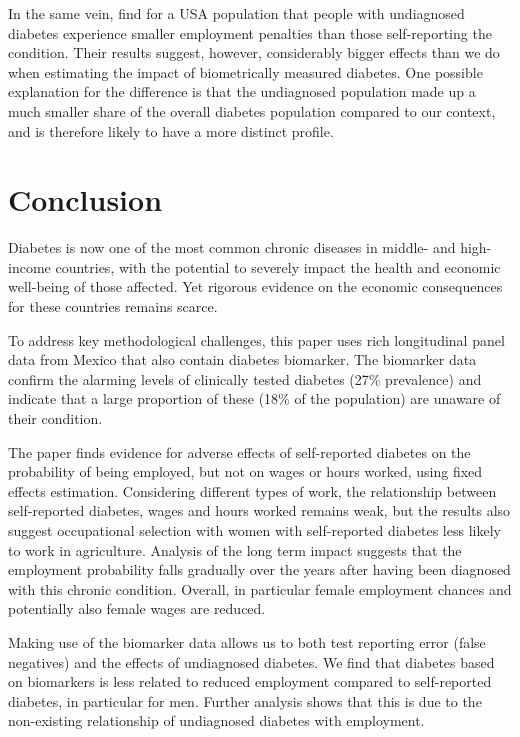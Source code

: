 \documentclass[12pt,english]{article}
\begin{document}
In the same vein, \textcite{Minor2015} find for a USA population that people with undiagnosed diabetes experience smaller employment penalties than those self-reporting the condition. Their results suggest, however, considerably bigger effects than we do when estimating the impact of biometrically measured diabetes. One possible explanation for the difference is that the undiagnosed population made up a much smaller share of the overall diabetes population compared to our context, and is therefore likely to have a more distinct profile.
\FloatBarrier


\section{\label{sec:cha_4_conclusion}Conclusion}

Diabetes is now one of the most common chronic diseases in middle- and high-income countries, with the potential to severely impact the health and economic well-being of those affected. Yet rigorous evidence on the economic consequences for these countries
remains scarce. 

To address key methodological challenges, this paper uses rich longitudinal panel data from Mexico that also contain diabetes biomarker. The biomarker data confirm the alarming levels of clinically tested diabetes (27\% prevalence) and indicate that a large proportion of these (18\% of the population) are unaware of their condition.

The paper finds evidence for adverse effects of self-reported diabetes on the probability of being employed, but not on wages or hours worked, using fixed effects estimation. Considering different types of work, the relationship between self-reported diabetes, wages
and hours worked remains weak, but the results also suggest occupational selection with women with self-reported diabetes less likely to work in agriculture. Analysis of the long term impact suggests that the employment probability falls gradually over the years
after having been diagnosed with this chronic condition. Overall, in particular female employment chances and potentially also female wages are reduced.

Making use of the biomarker data allows us to both test reporting error (false negatives) and the effects of undiagnosed diabetes. We find that diabetes based on biomarkers is less related to reduced employment compared to self-reported diabetes, in particular for men. Further analysis shows that this is due to the non-existing relationship of undiagnosed diabetes with employment.
\end{document}
